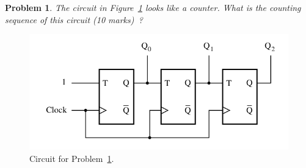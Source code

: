 \documentclass[twocolumn]{article}
\newtheorem{prob}{Problem}
\begin{document}
\begin{prob}
  The circuit in Figure~\ref{fig:p5.3} looks like a counter. What is the
  counting sequence of this circuit (10 marks)~\cite[Prob 5.17]{brown2013fundamentals}?
  \label{prob:6}
\end{prob}
\begin{figure}[ht!]
  \includegraphics[width=\linewidth]{fig-p5.3.png}
  \caption{Circuit for Problem~\ref{prob:6}.}
    \label{fig:p5.3}
\end{figure}



\end{document}
